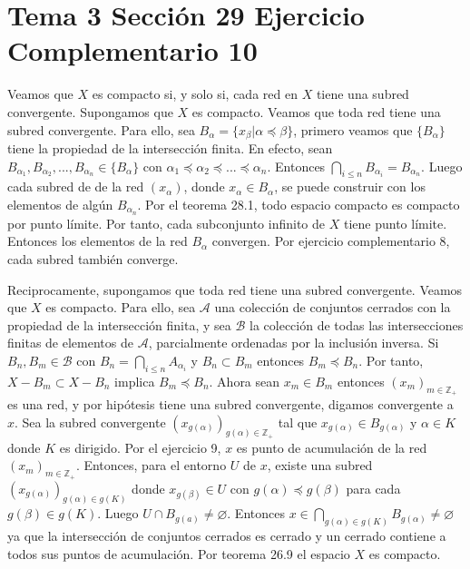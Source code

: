 \documentclass{article}
\begin{document}
\section{Tema 3 Sección 29 Ejercicio Complementario 10}
Veamos que $X$ es compacto si, y solo si, cada red en $X$ tiene una subred convergente.
Supongamos que $X$ es compacto. Veamos que toda red tiene una subred convergente. Para ello, sea $B_\alpha=\{x_\beta|\alpha\preceq \beta\}$, primero veamos que $\{B_\alpha\}$ tiene la propiedad de la intersección finita. En efecto, sean $B_{\alpha_1},B_{\alpha_2},...,B_{\alpha_n}\in\{B_\alpha\}$ con $\alpha_1\preceq \alpha_2\preceq...\preceq\alpha_n$. Entonces $\bigcap_{i\leq n}B_{\alpha_i}=B_{\alpha_n}$. Luego cada subred de de la red $(x_\alpha)$, donde $x_\alpha\in B_\alpha$, se puede construir con los elementos de algún $B_{\alpha_n}$. Por el teorema 28.1, todo espacio compacto es compacto por punto límite. Por tanto, cada subconjunto infinito de $X$ tiene punto límite. Entonces los elementos de la red $B_\alpha$ convergen. Por ejercicio complementario 8, cada subred también converge.

Reciprocamente, supongamos que toda red tiene una subred convergente. Veamos que $X$ es compacto. Para ello, sea $\mathcal{A}$ una colección de conjuntos cerrados con la propiedad de la intersección 
finita, y sea $\mathcal{B}$ la colección de todas las intersecciones finitas de elementos de 
$\mathcal{A}$, parcialmente ordenadas por la inclusión inversa. Si $B_n,B_m\in \mathcal{B}$ con $B_n=\bigcap_{i\leq n}A_{\alpha_i}$ y $B_n\subset B_m$ entonces $B_m\preceq B_n$. Por tanto, $X-B_m\subset X-B_n$ implica $B_m\preceq B_n$. Ahora sean $x_m\in B_m$ entonces $(x_m)_{m\in \mathbb{Z}_+}$ es una red, y por hipótesis tiene una subred convergente, digamos convergente a $x$. Sea la subred convergente $(x_{g(\alpha)})_{g(\alpha)\in \mathbb{Z}_+}$ tal que $x_{g(\alpha)}\in B_{g(\alpha)}$ y $\alpha\in K$ donde $K$ es dirigido. Por el ejercicio 9, $x$ es punto de acumulación de la red $(x_m)_{m\in \mathbb{Z}_+}$. Entonces, para el entorno $U$ de $x$, existe una subred $(x_{g(\alpha)})_{g(\alpha)\in g(K)}$ donde  $x_{g(\beta)} \in U$  con $g(\alpha) \preceq g(\beta)$ para cada $g(\beta)\in g(K)$. Luego $U\cap B_{g( a)}\neq \varnothing$.  Entonces $x\in \bigcap_{g(\alpha)\in g(K)}B_{g(\alpha)}\neq \varnothing$ ya que la intersección de conjuntos cerrados es cerrado y un cerrado contiene a todos sus puntos de acumulación. Por teorema 26.9 el espacio $X$ es compacto.
\end{document}
